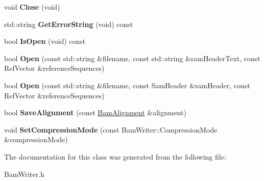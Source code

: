 \begin{DoxyCompactItemize}
\item 
\hypertarget{classBamTools_1_1BamWriter_add4919eee840f0b8ec563f09753f56bd}{void {\bfseries Close} (void)}\label{classBamTools_1_1BamWriter_add4919eee840f0b8ec563f09753f56bd}

\item 
\hypertarget{classBamTools_1_1BamWriter_a9bd5ac1321999a4026c86bcc00c0f8e0}{std\-::string {\bfseries Get\-Error\-String} (void) const }\label{classBamTools_1_1BamWriter_a9bd5ac1321999a4026c86bcc00c0f8e0}

\item 
\hypertarget{classBamTools_1_1BamWriter_a4e6958a6d8880789be94e2524ea3cf02}{bool {\bfseries Is\-Open} (void) const }\label{classBamTools_1_1BamWriter_a4e6958a6d8880789be94e2524ea3cf02}

\item 
\hypertarget{classBamTools_1_1BamWriter_a437d56d26a9d10a18c365888f7dbbfff}{bool {\bfseries Open} (const std\-::string \&filename, const std\-::string \&sam\-Header\-Text, const Ref\-Vector \&reference\-Sequences)}\label{classBamTools_1_1BamWriter_a437d56d26a9d10a18c365888f7dbbfff}

\item 
\hypertarget{classBamTools_1_1BamWriter_a76bc87c296f11f57e833edd4778d7b5e}{bool {\bfseries Open} (const std\-::string \&filename, const Sam\-Header \&sam\-Header, const Ref\-Vector \&reference\-Sequences)}\label{classBamTools_1_1BamWriter_a76bc87c296f11f57e833edd4778d7b5e}

\item 
\hypertarget{classBamTools_1_1BamWriter_a7706be2b1fe7d7c43dad819000e7282d}{bool {\bfseries Save\-Alignment} (const \hyperlink{structBamTools_1_1BamAlignment}{Bam\-Alignment} \&alignment)}\label{classBamTools_1_1BamWriter_a7706be2b1fe7d7c43dad819000e7282d}

\item 
\hypertarget{classBamTools_1_1BamWriter_a3ff91ed3960b697d2f40fc60a31394b8}{void {\bfseries Set\-Compression\-Mode} (const Bam\-Writer\-::\-Compression\-Mode \&compression\-Mode)}\label{classBamTools_1_1BamWriter_a3ff91ed3960b697d2f40fc60a31394b8}

\end{DoxyCompactItemize}


The documentation for this class was generated from the following file\-:\begin{DoxyCompactItemize}
\item 
Bam\-Writer.\-h\end{DoxyCompactItemize}
